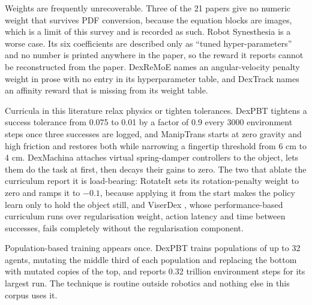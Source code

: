 Weights are frequently unrecoverable. Three of the 21 papers give no numeric weight that survives
PDF conversion, because the equation blocks are images, which is a limit of this survey and is
recorded as such. Robot Synesthesia \cite{robot_synesthesia_2023} is a worse case. Its six
coefficients are described only as ``tuned hyper-parameters'' and no number is printed anywhere in
the paper, so the reward it reports cannot be reconstructed from the paper. DexReMoE
\cite{dexremoe_2025} names an angular-velocity penalty weight in prose with no entry in its
hyperparameter table, and DexTrack \cite{dextrack_2025} names an affinity reward that is missing
from its weight table.

\label{sec:train:rl:curricula}
Curricula in this literature relax physics or tighten tolerances. DexPBT \cite{dexpbt_2023}
tightens a success tolerance from 0.075 to 0.01 by a factor of 0.9 every 3000 environment steps
once three successes are logged, and ManipTrans \cite{maniptrans_2025} starts at zero gravity and
high friction and restores both while narrowing a fingertip threshold from 6 cm to 4 cm.
DexMachina \cite{dexmachina_2025} attaches virtual spring-damper controllers to the object, lets
them do the task at first, then decays their gains to zero. The two that ablate the curriculum
report it is load-bearing: RotateIt \cite{rotateit_2023} sets its rotation-penalty weight to zero
and ramps it to $-0.1$, because applying it from the start makes the policy learn only to hold the
object still, and ViserDex \cite{viserdex_2026}, whose performance-based curriculum runs over
regularisation weight, action latency and time between successes, fails completely without the
regularisation component.

Population-based training appears once. DexPBT \cite{dexpbt_2023} trains populations of up to
32 agents, mutating the middle third of each population and replacing the bottom with mutated
copies of the top, and reports 0.32 trillion environment steps for its largest run. The
technique is routine outside robotics and nothing else in this corpus uses it.

